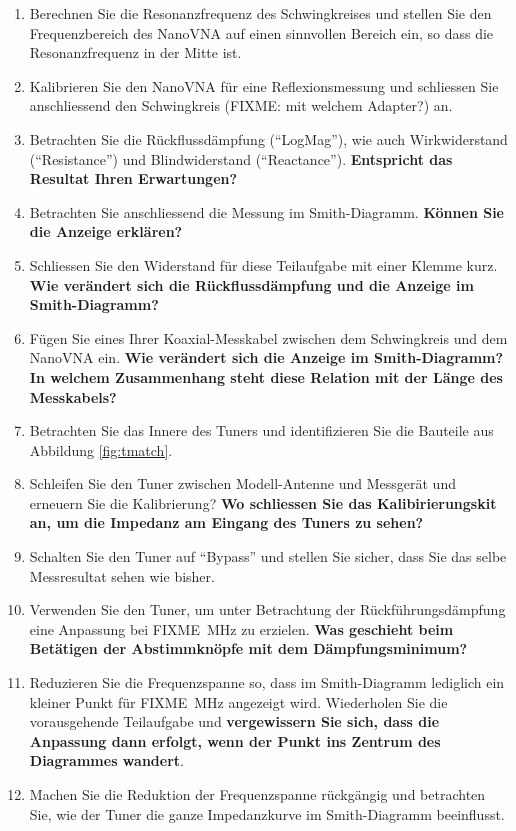 \documentclass[twoside,a4paper,11pt,halfparskip,DIV=11,notitlepage]{scrartcl}
\begin{document}
\begin{enumerate}
    \item Berechnen Sie die Resonanzfrequenz des Schwingkreises und stellen Sie den
        Frequenzbereich des NanoVNA auf einen sinnvollen Bereich ein, so dass die
        Resonanzfrequenz in der Mitte ist.
    \item Kalibrieren Sie den NanoVNA für eine Reflexionsmessung und schliessen Sie
        anschliessend den Schwingkreis (FIXME: mit welchem Adapter?) an.
    \item Betrachten Sie die Rückflussdämpfung (``LogMag''), wie auch Wirkwiderstand
        (``Resistance'') und Blindwiderstand (``Reactance'').
        \textbf{Entspricht das Resultat Ihren Erwartungen?}
    \item Betrachten Sie anschliessend die Messung im Smith-Diagramm. \textbf{Können Sie die
        Anzeige erklären?}
    \item Schliessen Sie den Widerstand für diese Teilaufgabe mit einer Klemme
        kurz. \textbf{Wie verändert sich die Rückflussdämpfung und die Anzeige
        im Smith-Diagramm?}
    \item Fügen Sie eines Ihrer Koaxial-Messkabel zwischen dem Schwingkreis und dem
        NanoVNA ein. \textbf{Wie verändert sich die Anzeige im Smith-Diagramm? In welchem
        Zusammenhang steht diese Relation mit der Länge des Messkabels?}
    \item Betrachten Sie das Innere des Tuners und identifizieren Sie die Bauteile aus 
        Abbildung \ref{fig:tmatch}.
    \item Schleifen Sie den Tuner zwischen Modell-Antenne und Messgerät und erneuern Sie die
        Kalibrierung? \textbf{Wo schliessen Sie das Kalibirierungskit an, um die Impedanz
        am Eingang des Tuners zu sehen?}
    \item Schalten Sie den Tuner auf ``Bypass'' und stellen Sie sicher, dass Sie das selbe
        Messresultat sehen wie bisher.
    \item Verwenden Sie den Tuner, um unter Betrachtung der Rückführungsdämpfung eine
        Anpassung bei FIXME~MHz zu erzielen. \textbf{Was geschieht beim Betätigen der
        Abstimmknöpfe mit dem Dämpfungsminimum?}
    \item Reduzieren Sie die Frequenzspanne so, dass im Smith-Diagramm lediglich ein
        kleiner Punkt für FIXME~MHz angezeigt wird. Wiederholen Sie die
        vorausgehende Teilaufgabe und \textbf{vergewissern Sie sich, dass die Anpassung
        dann erfolgt, wenn der Punkt ins Zentrum des Diagrammes wandert}.
    \item Machen Sie die Reduktion der Frequenzspanne rückgängig und betrachten Sie, wie
        der Tuner die ganze Impedanzkurve im Smith-Diagramm beeinflusst.
\end{enumerate}
\end{document}
